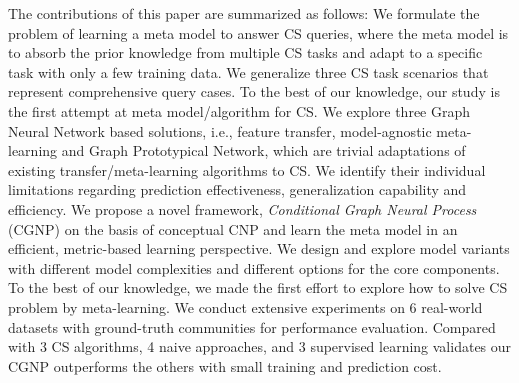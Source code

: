\documentclass[conference]{IEEEtran}
\begin{document}
The contributions of this paper are summarized as follows:
%
 We formulate the problem of learning a meta model to answer CS queries, where the meta model is to absorb the prior knowledge from multiple CS tasks and adapt to a specific task with only a few training data.  We generalize three CS task scenarios that represent comprehensive query cases. To the best of our knowledge, our study is the first attempt at meta model/algorithm for CS.
%
 We explore three Graph Neural Network based solutions, i.e., feature transfer, model-agnostic meta-learning and Graph Prototypical Network, which are trivial adaptations of existing transfer/meta-learning algorithms to CS. 
We identify their individual limitations regarding prediction effectiveness, generalization capability and efficiency.
%
 We propose a novel framework, \emph{Conditional Graph Neural Process} (CGNP) on the basis of conceptual CNP and learn the meta model in an efficient, metric-based learning perspective. We design and explore model variants with different model complexities and different options for the core components. To the best of our knowledge, we made the first effort to explore how to solve CS problem by meta-learning.
%
 We conduct extensive experiments on 6 real-world datasets
with ground-truth communities for performance evaluation. Compared
with 3 CS algorithms, 4 naive approaches, and 3 supervised
learning validates our CGNP outperforms the others
with small training and prediction cost.




\end{document}
